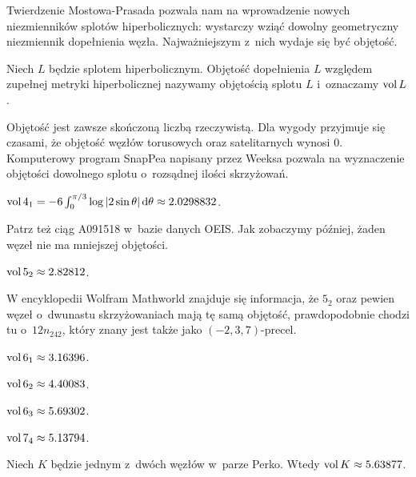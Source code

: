 Twierdzenie Mostowa-Prasada pozwala nam na wprowadzenie nowych niezmienników splotów hiperbolicznych: wystarczy wziąć dowolny geometryczny niezmiennik dopełnienia węzła.
Najważniejszym z~nich wydaje się być objętość.

\begin{definition}[objętość]
    Niech $L$ będzie splotem hiperbolicznym.
    Objętość dopełnienia $L$ względem zupełnej metryki hiperbolicznej nazywamy objętością splotu $L$ i~oznaczamy $\operatorname{vol} L$.
\end{definition}

Objętość jest zawsze skończoną liczbą rzeczywistą.
Dla wygody przyjmuje się czasami, że objętość węzłów torusowych oraz satelitarnych wynosi $0$.
Komputerowy program SnapPea napisany przez Weeksa pozwala na wyznaczenie objętości dowolnego splotu o~rozsądnej ilości skrzyżowań.

\begin{example}
    $\operatorname{vol} 4_1 = -6 \int_{0}^{\pi/3} \log |2\sin \theta| \,\mathrm{d}\theta \approx 2.0298832$.
\end{example}

Patrz też ciąg A091518 w~bazie danych OEIS.
Jak zobaczymy później, żaden węzeł nie ma mniejszej objętości.

\begin{example}
    $\operatorname{vol} 5_2 \approx 2.82812$.
\end{example}

W encyklopedii Wolfram Mathworld znajduje się informacja, że $5_2$ oraz pewien węzeł o~dwunastu skrzyżowaniach mają tę samą objętość, prawdopodobnie chodzi tu o~$12n_{242}$, który znany jest także jako $(-2, 3, 7)$-precel.

\begin{example}
    $\operatorname{vol} 6_1 \approx 3.16396$.
\end{example}

\begin{example}
    $\operatorname{vol} 6_2 \approx 4.40083$.
\end{example}

\begin{example}
    $\operatorname{vol} 6_3 \approx 5.69302$.
\end{example}

\begin{example}
    $\operatorname{vol} 7_4 \approx 5.13794$.
\end{example}

\begin{example}
    Niech $K$ będzie jednym z~dwóch węzłów w~parze Perko.
    Wtedy $\operatorname{vol} K \approx 5.63877$.
\end{example}

